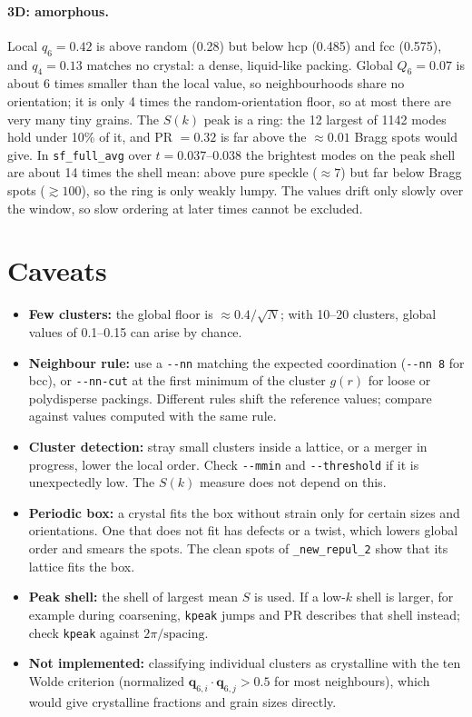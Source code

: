 \documentclass[11pt]{article}
\newcommand{\code}[1]{\texttt{#1}}
\begin{document}
\paragraph{3D: amorphous.} Local $q_6=0.42$ is above random (0.28) but below
hcp (0.485) and fcc (0.575), and $q_4=0.13$ matches no crystal: a dense,
liquid-like packing. Global $Q_6=0.07$ is about 6 times smaller than the local
value, so neighbourhoods share no orientation; it is only 4 times the
random-orientation floor, so at most there are very many tiny grains. The
$S(k)$ peak is a ring: the 12 largest of 1142 modes hold under 10\% of it, and
PR $=0.32$ is far above the $\approx0.01$ Bragg spots would give. In
\code{sf\_full\_avg} over $t=0.037$--$0.038$ the brightest modes on the peak
shell are about 14 times the shell mean: above pure speckle ($\approx7$) but
far below Bragg spots ($\gtrsim100$), so the ring is only weakly lumpy. The values
drift only slowly over the window, so slow ordering at later times cannot be
excluded.

\section{Caveats}
\begin{itemize}
  \item \textbf{Few clusters:} the global floor is $\approx0.4/\sqrt N$; with
        10--20 clusters, global values of 0.1--0.15 can arise by chance.
  \item \textbf{Neighbour rule:} use a \code{-{}-nn} matching the expected
        coordination (\code{-{}-nn 8} for bcc), or \code{-{}-nn-cut} at the
        first minimum of the cluster $g(r)$ for loose or polydisperse
        packings. Different rules shift the reference values; compare
        against values computed with the same rule.
  \item \textbf{Cluster detection:} stray small clusters inside a lattice, or a
        merger in progress, lower the local order. Check \code{-{}-mmin} and
        \code{-{}-threshold} if it is unexpectedly low. The $S(k)$ measure
        does not depend on this.
  \item \textbf{Periodic box:} a crystal fits the box without strain only for
        certain sizes and orientations. One that does not fit has defects or a
        twist, which lowers global order and smears the spots. The clean spots
        of \code{\_new\_repul\_2} show that its lattice fits the box.
  \item \textbf{Peak shell:} the shell of largest mean $S$ is used. If a low-$k$
        shell is larger, for example during coarsening, \code{kpeak} jumps and
        PR describes that shell instead; check \code{kpeak} against
        $2\pi/\text{spacing}$.
  \item \textbf{Not implemented:} classifying individual clusters as
        crystalline with the ten Wolde criterion (normalized
        $\mathbf q_{6,i}\cdot\mathbf q_{6,j}>0.5$ for most neighbours), which
        would give crystalline fractions and grain sizes directly.
\end{itemize}
\end{document}
